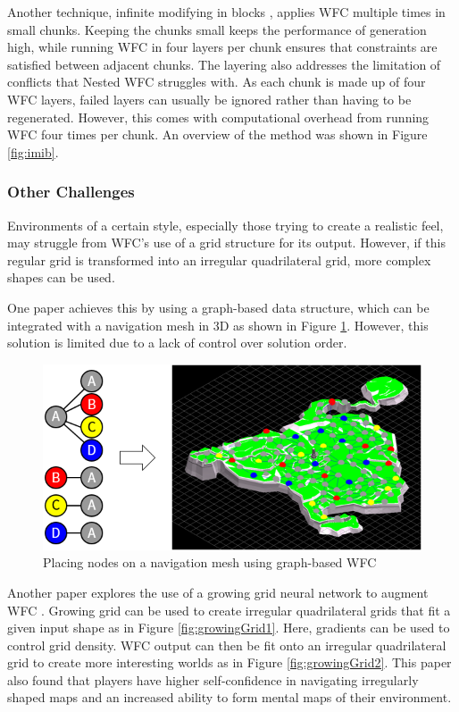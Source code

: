 Another technique, infinite modifying in blocks \cite{Infinite_Modifying_In_Blocks}, applies WFC multiple times in small chunks. Keeping the chunks small keeps the performance of generation high, while running WFC in four layers per chunk ensures that constraints are satisfied between adjacent chunks. The layering also addresses the limitation of conflicts that Nested WFC struggles with. As each chunk is made up of four WFC layers, failed layers can usually be ignored rather than having to be regenerated. However, this comes with computational overhead from running WFC four times per chunk. An overview of the method was shown in Figure \ref{fig:imib}.

\subsubsection{Other Challenges}
Environments of a certain style, especially those trying to create a realistic feel, may struggle from WFC's use of a grid structure for its output. However, if this regular grid is transformed into an irregular quadrilateral grid, more complex shapes can be used.

One paper \cite{WFC_Graph-based} achieves this by using a graph-based data structure, which can be integrated with a navigation mesh in 3D as shown in Figure \ref{fig:navigationMeshNodePlacement}. However, this solution is limited due to a lack of control over solution order.

\begin{figure}[H]
        \centering
        \includegraphics[width=\textwidth, height=0.3\textheight, keepaspectratio]{Images/NavigationMeshNodePlacement.png}
        \caption{Placing nodes on a navigation mesh using graph-based WFC \cite{WFC_Graph-based}}
        \label{fig:navigationMeshNodePlacement}
\end{figure}

Another paper explores the use of a growing grid neural network to augment WFC \cite{WFC_Neural_Network}. Growing grid can be used to create irregular quadrilateral grids that fit a given input shape as in Figure \ref{fig:growingGrid1}. Here, gradients can be used to control grid density. WFC output can then be fit onto an irregular quadrilateral grid to create more interesting worlds as in Figure \ref{fig:growingGrid2}. This paper also found that players have higher self-confidence in navigating irregularly shaped maps and an increased ability to form mental maps of their environment.

